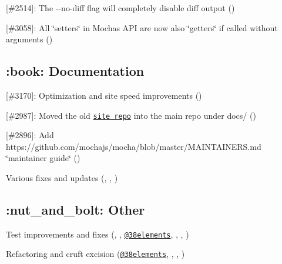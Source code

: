 \begin{DoxyItemize}
\item \mbox{[}\#2514\mbox{]}\+: The {\ttfamily -\/-\/no-\/diff} flag will completely disable diff output (\href{https://github.com/CapacitorSet}{\tt })
\item \mbox{[}\#3058\mbox{]}\+: All \char`\"{}setters\char`\"{} in Mocha\textquotesingle{}s A\+PI are now also \char`\"{}getters\char`\"{} if called without arguments (\href{https://github.com/makepanic}{\tt })
\end{DoxyItemize}

\subsection*{\+:book\+: Documentation}


\begin{DoxyItemize}
\item \mbox{[}\#3170\mbox{]}\+: Optimization and site speed improvements (\href{https://github.com/munter}{\tt })
\item \mbox{[}\#2987\mbox{]}\+: Moved the old \href{https://github.com/mochajs/mochajs.github.io}{\tt site repo} into the main repo under {\ttfamily docs/} (\href{https://github.com/boneskull}{\tt })
\item \mbox{[}\#2896\mbox{]}\+: Add https\+://github.com/mochajs/mocha/blob/master/\+M\+A\+I\+N\+T\+A\+I\+N\+E\+R\+S.\+md \char`\"{}maintainer guide\char`\"{} (\href{https://github.com/boneskull}{\tt })
\item Various fixes and updates (\href{https://github.com/xxczaki}{\tt }, \href{https://github.com/maty21}{\tt }, \href{https://github.com/leedm777}{\tt })
\end{DoxyItemize}

\subsection*{\+:nut\+\_\+and\+\_\+bolt\+: Other}


\begin{DoxyItemize}
\item Test improvements and fixes (\href{https://github.com/eugenet8k}{\tt }, \href{https://github.com/ngeor}{\tt }, \href{https://github.com/38elements}{\tt @38elements}, \href{https://github.com/Gerhut}{\tt }, \href{https://github.com/ScottFreeCode}{\tt }, \href{https://github.com/boneskull}{\tt })
\item Refactoring and cruft excision (\href{https://github.com/38elements}{\tt @38elements}, \href{https://github.com/Bamieh}{\tt }, \href{https://github.com/finnigantime}{\tt }, \href{https://github.com/boneskull}{\tt })
\end{DoxyItemize}


